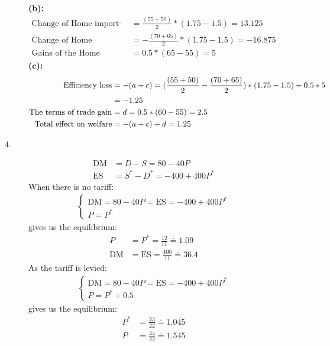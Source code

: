 \documentclass{article}
\begin{document}
\begin{description}
\begin{description}
\begin{figure}[H]
        \end{figure}
      {\bf (b):}
      \begin{align}
        \text{Change of Home import-competing producers' welfare}&=\frac{(55+50)}{2}*(1.75-1.5)=13.125\\
        \text{Change of Home consumers' welfare}&=-\frac{(70+65)}{2}*(1.75-1.5)=-16.875\\
        \text{Gains of the Home government}&=0.5*(65-55)=5
      \end{align}
      {\bf (c):}
      \begin{align}\notag
        \text{Efficiency loss}&=-(a+c)=(\frac{(55+50)}{2}-\frac{(70+65)}{2})*(1.75-1.5)+0.5*5\\  &=-1.25\\
        \text{The terms of trade gain}&=d=0.5*(60-55)=2.5\\
        \text{Total effect on welfare}&=-(a+c)+d=1.25
      \end{align}
      \item[4.]
        \begin{align}
        \text{DM}&=D-S=80-40P\\
        \text{ES}&=S^*-D^*=-400+400P^*
        \end{align}
         When there is no tariff:
        \begin{align}
        \begin{cases} \text{DM}=80-40P=\text{ES}=-400+400P^* \\
                P=P^*
        \end{cases}
        \end{align}
        gives us the equilibrium:
        \begin{align}
          P&=P^*=\frac{12}{11}\doteq 1.09\\
          \text{DM}&=\text{ES}=\frac{400}{11}\doteq 36.4
        \end{align}
        As the tariff is levied:
        \begin{align}
          \begin{cases}
            \text{DM}=80-40P=\text{ES}=-400+400P^* \\
             P=P^*+0.5\end{cases}
        \end{align}
        gives us the equilibrium:
        \begin{align}
          P^*&=\frac{23}{22}\doteq 1.045\\
          P&=\frac{34}{22}\doteq 1.545\\

\end{align}
\end{description}
\end{description}
\end{document}

